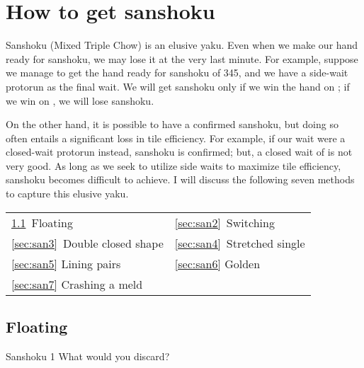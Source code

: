 \newpage
\section{How to get {\jap sanshoku}}  \label{sec:san}

{\jap Sanshoku} (Mixed Triple Chow) is an elusive {\jap yaku}. 
Even when we make our hand ready for {\jap sanshoku}, we may lose it at the very last minute. For example, suppose we manage to get the hand ready for {\jap sanshoku} of 345, and we have a side-wait protorun {\LARGE{}} as the final wait. We will get {\jap sanshoku} only if we win the hand on {\LARGE{}}; if we win on {\LARGE{}}, we will lose {\jap sanshoku}.

\bigskip
On the other hand, it is possible to have a confirmed {\jap sanshoku}, but doing so often entails a significant loss in tile efficiency. For example, if our wait were a closed-wait protorun {\LARGE{}} instead, {\jap sanshoku} is confirmed; but, a closed wait of {\LARGE{}} is not very good. As long as we seek to utilize side waits to maximize tile efficiency, {\jap sanshoku} becomes difficult to achieve. I will discuss the following seven methods to capture this elusive {\jap yaku}. 

\bigskip
\begin{center}
\begin{tabular}{l l}
\ref{sec:san1}~Floating & \ref{sec:san2}~Switching\\
\ref{sec:san3}~Double closed shape & \ref{sec:san4}~Stretched single\\
\ref{sec:san5} Lining pairs &\ref{sec:san6} Golden\\
\ref{sec:san7} Crashing a meld\\
\end{tabular}
\end{center}


\bigskip
\subsection{Floating}\label{sec:san1}

\begin{itembox}[r]{{\jap Sanshoku} 1}
\bp
{}\bei
\ep
\vspace{-10pt} What would you discard? \vspace{-5pt}
\end{itembox}

